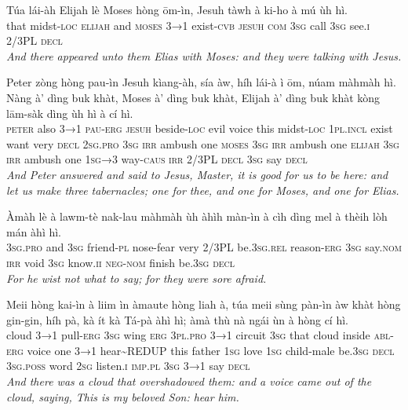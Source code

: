 \documentclass[11pt,a4paper]{article}
\begin{document}
\begin{exe}
\gll Túa lái-àh Elijah lè Moses hòng ōm-ìn, Jesuh tàwh à ki-ho à mú ùh hì. \\
     that midst-\textsc{loc} \textsc{elijah} and \textsc{moses} \textsc{3→1} exist-\textsc{cvb} \textsc{jesuh} \textsc{com} \textsc{3sg} call \textsc{3sg} see.\textsc{i} 2/3PL \textsc{decl} \\
\glt \textcolor{kjvcolor}{\textit{And there appeared unto them Elias with Moses: and they were talking with Jesus.}}

\gll Peter zòng hòng pau-ìn Jesuh kìang-àh, sía àw, híh lái-à ì ōm, núam màhmàh hì. Nàng à' dìng buk khàt, Moses à' dìng buk khàt, Elijah à' dìng buk khàt kòng lām-sàk dìng ùh hì à cí hì. \\
     \textsc{peter} also \textsc{3→1} \textsc{pau}-\textsc{erg} \textsc{jesuh} beside-\textsc{loc} evil voice this midst-\textsc{loc} \textsc{1pl}.\textsc{incl} exist want very \textsc{decl} \textsc{2sg}.\textsc{pro} \textsc{3sg} \textsc{irr} ambush one \textsc{moses} \textsc{3sg} \textsc{irr} ambush one \textsc{elijah} \textsc{3sg} \textsc{irr} ambush one \textsc{1sg→3} way-\textsc{caus} \textsc{irr} 2/3PL \textsc{decl} \textsc{3sg} say \textsc{decl} \\
\glt \textcolor{kjvcolor}{\textit{And Peter answered and said to Jesus, Master, it is good for us to be here: and let us make three tabernacles; one for thee, and one for Moses, and one for Elias.}}

\gll Àmàh lè à lawm-tè nak-lau màhmàh ùh àhìh màn-ìn à cìh dìng mel à thèih lòh mán àhì hì. \\
     \textsc{3sg}.\textsc{pro} and \textsc{3sg} friend-\textsc{pl} nose-fear very 2/3PL be.\textsc{3sg}.\textsc{rel} reason-\textsc{erg} \textsc{3sg} say.\textsc{nom} \textsc{irr} void \textsc{3sg} know.\textsc{ii} \textsc{neg}-\textsc{nom} finish be.\textsc{3sg} \textsc{decl} \\
\glt \textcolor{kjvcolor}{\textit{For he wist not what to say; for they were sore afraid.}}

\gll Meii hòng kai-ìn à liim ìn àmaute hòng liah à, túa meii sùng pàn-ìn àw khàt hòng gin-gin, híh pà, kà ít kà Tá-pà àhì hì; àmà thù nà ngái ùn à hòng cí hì. \\
     cloud \textsc{3→1} pull-\textsc{erg} \textsc{3sg} wing \textsc{erg} \textsc{3pl}.\textsc{pro} \textsc{3→1} circuit \textsc{3sg} that cloud inside \textsc{abl}-\textsc{erg} voice one \textsc{3→1} hear\textasciitilde{}REDUP this father \textsc{1sg} love \textsc{1sg} child-male be.\textsc{3sg} \textsc{decl} \textsc{3sg}.\textsc{poss} word \textsc{2sg} listen.\textsc{i} \textsc{imp}.\textsc{pl} \textsc{3sg} \textsc{3→1} say \textsc{decl} \\
\glt \textcolor{kjvcolor}{\textit{And there was a cloud that overshadowed them: and a voice came out of the cloud, saying, This is my beloved Son: hear him.}}


\end{exe}
\end{document}

